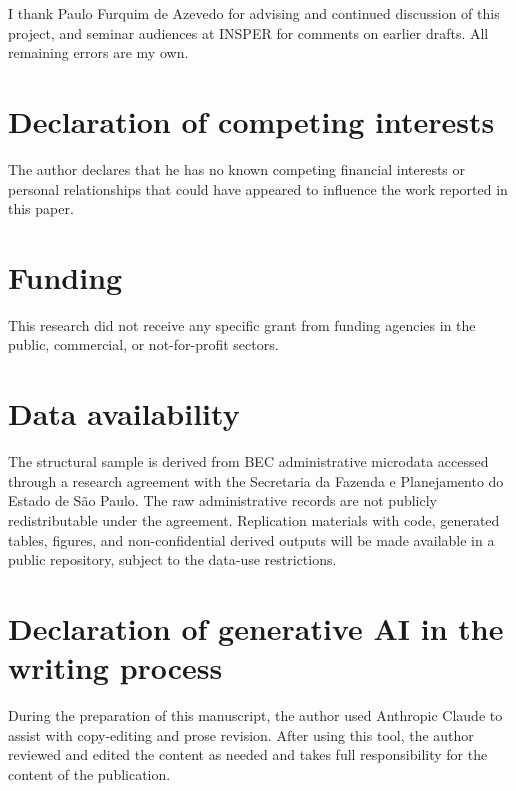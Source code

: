 \documentclass[12pt]{elsarticle}
\begin{document}
I thank Paulo Furquim de Azevedo for advising and continued discussion of
this project, and seminar audiences at INSPER for comments on earlier
drafts. All remaining errors are my own.

\section*{Declaration of competing interests}

The author declares that he has no known competing financial interests or
personal relationships that could have appeared to influence the work
reported in this paper.

\section*{Funding}

This research did not receive any specific grant from funding agencies in
the public, commercial, or not-for-profit sectors.

\section*{Data availability}

The structural sample is derived from BEC administrative microdata accessed
through a research agreement with the Secretaria da Fazenda e Planejamento
do Estado de S\~ao Paulo. The raw administrative records are not publicly
redistributable under the agreement. Replication materials with code,
generated tables, figures, and non-confidential derived outputs will be
made available in a public repository, subject to the data-use
restrictions.

\section*{Declaration of generative AI in the writing process}

During the preparation of this manuscript, the author used Anthropic
Claude to assist with copy-editing and prose revision. After using this
tool, the author reviewed and edited the content as needed and takes full
responsibility for the content of the publication.

\clearpage


\end{document}
